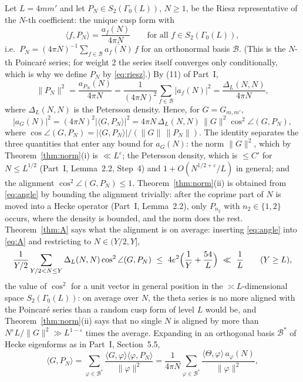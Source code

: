 ﻿\documentclass[11pt]{amsart}
\theoremstyle{remark}
\newcommand{\e}{\varepsilon}
\begin{document}
Let $L=4mm'$ and let $P_N\in S_2(\Gamma_0(L))$, $N\ge1$, be the Riesz representative of the $N$-th coefficient: the unique cusp form with
\begin{equation}\label{eq:riesz}
\langle f,P_N\rangle=\frac{a_f(N)}{4\pi N}\qquad\text{for all }f\in S_2(\Gamma_0(L)),
\end{equation}
i.e.\ $P_N=(4\pi N)^{-1}\sum_{f\in\mathcal B}\overline{a_f(N)}\,f$ for an orthonormal basis $\mathcal B$. (This is the $N$-th Poincar\'e series; for weight $2$ the series itself converges only conditionally, which is why we define $P_N$ by \eqref{eq:riesz}.) By (11) of Part~I,
\[
\|P_N\|^2=\frac{a_{P_N}(N)}{4\pi N}=\frac{1}{(4\pi N)^2}\sum_{f\in\mathcal B}|a_f(N)|^2=\frac{\Delta_L(N,N)}{4\pi N},
\]
where $\Delta_L(N,N)$ is the Petersson density. Hence, for $G=G_{m,m'}$,
\begin{equation}\label{eq:angle}
|a_G(N)|^2=(4\pi N)^2|\langle G,P_N\rangle|^2=4\pi N\,\Delta_L(N,N)\,\|G\|^2\cos^2\angle(G,P_N),
\end{equation}
where $\cos\angle(G,P_N)=|\langle G,P_N\rangle|/(\|G\|\,\|P_N\|)$. The identity separates the three quantities that enter any bound for $a_G(N)$: the norm $\|G\|^2$, which by Theorem~\ref{thm:norm}(i) is $\ll L^\e$; the Petersson density, which is $\le C'$ for $N\le L^{1/2}$ (Part~I, Lemma~2.2, Step~4) and $1+O(N^{1/2+\e}/L)$ in general; and the alignment $\cos^2\angle(G,P_N)\le1$. Theorem~\ref{thm:norm}(ii) is obtained from \eqref{eq:angle} by bounding the alignment trivially: after the coprime part of $N$ is moved into a Hecke operator (Part~I, Lemma~2.2), only $P_{n_2}$ with $n_2\in\{1,2\}$ occurs, where the density is bounded, and the norm does the rest. Theorem~\ref{thm:A} says what the alignment is on average: inserting \eqref{eq:angle} into \eqref{eq:A} and restricting to $N\in(Y/2,Y]$,
\begin{equation}\label{eq:avgangle}
\frac{1}{Y/2}\sum_{Y/2<N\le Y}\Delta_L(N,N)\cos^2\angle(G,P_N)\ \le\ 4e^2\Bigl(\frac1Y+\frac{54}L\Bigr)\ \ll\ \frac1L\qquad(Y\ge L),
\end{equation}
the value of $\cos^2$ for a unit vector in general position in the $\asymp L$-dimensional space $S_2(\Gamma_0(L))$: on average over $N$, the theta series is no more aligned with the Poincar\'e series than a random cusp form of level $L$ would be, and Theorem~\ref{thm:norm}(ii) says that no single $N$ is aligned by more than $N^\e L/\|G\|^2\gg L^{1-\e}$ times the average. Expanding in an orthogonal basis $\mathcal B^*$ of Hecke eigenforms as in Part~I, Section~5.5,
\[
\langle G,P_N\rangle=\sum_{\varphi\in\mathcal B^*}\frac{\langle G,\varphi\rangle\langle\varphi,P_N\rangle}{\|\varphi\|^2}=\frac{1}{4\pi N}\sum_{\varphi\in\mathcal B^*}\frac{\langle\Theta,\varphi\rangle\,a_\varphi(N)}{\|\varphi\|^2},
\]
\end{document}
